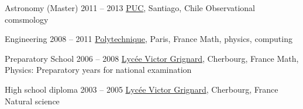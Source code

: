 \def\tbflanguage{english}
\def\tbfbordertop{1}
\def\tbfborderleft{0.7}









\begin{coordinatelist}
\end{coordinatelist}




\begin{yearlist}[7.7][\tbfborderleft][4]


\item[Astronomy (Master)]{2011 -- 2013}
  {
  \href{http://www.uc.cl/}{PUC}, Santiago, Chile
  }
  {   Observational comsmology}
    

\item[Engineering]{2008 -- 2011}
  {
  \href{https://www.polytechnique.edu/}{Polytechnique}, Paris, France
  }
  {    Math, physics, computing}


\item[Preparatory School]{2006 -- 2008}
  {
  \href{http://www.lycee-grignard.fr/}{Lyc\'ee Victor Grignard}, Cherbourg, France
  }
  {    Math, Physics: Preparatory years for national examination}


\item[High school diploma]{2003 -- 2005}
  {
  \href{http://www.lycee-grignard.fr/}{Lyc\'ee Victor Grignard}, Cherbourg, France
  }
  {    Natural science}
    
\end{yearlist}


